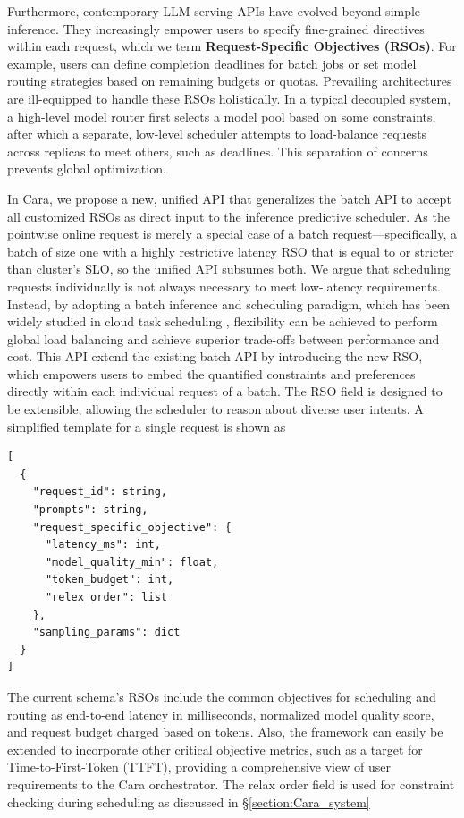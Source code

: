 \documentclass[letterpaper, anonymous, twocolumn, 10pt]{article}
\begin{document}
Furthermore, contemporary LLM serving APIs have evolved beyond simple inference. They increasingly empower users to specify fine-grained directives within each request, which we term \textbf{Request-Specific Objectives (RSOs)}. For example, users can define completion deadlines for batch jobs or set model routing strategies \cite{openaiIntroducingGPT5, microsoftModelRouter} based on remaining budgets or quotas. Prevailing architectures are ill-equipped to handle these RSOs holistically. In a typical decoupled system, a high-level model router first selects a model pool based on some constraints, after which a separate, low-level scheduler attempts to load-balance requests across replicas to meet others, such as deadlines. This separation of concerns prevents global optimization.

In Cara, we propose a new, unified API that generalizes the batch API to accept all customized RSOs as direct input to the inference predictive scheduler. As the pointwise online request is merely a special case of a batch request—specifically, a batch of size one with a highly restrictive latency RSO that is equal to or stricter than cluster's SLO, so the unified API subsumes both. We argue that scheduling requests individually is not always necessary to meet low-latency requirements. Instead, by adopting a batch inference and scheduling paradigm, which has been widely studied in cloud task scheduling \cite{eva-eurosys}, flexibility can be achieved to perform global load balancing and achieve superior trade-offs between performance and cost.  This API extend the existing batch API by introducing the new RSO, which empowers users to embed the quantified constraints and preferences directly within each individual request of a batch. The RSO field is designed to be extensible, allowing the scheduler to reason about diverse user intents. A simplified template for a single request is shown as
\begin{minipage}{\linewidth}
\begin{lstlisting}[style=jsonstyle, caption={Schema for Generate API request with RSOs.}, label={lst:api_schema}]
[
  {
    "request_id": string,
    "prompts": string,
    "request_specific_objective": {
      "latency_ms": int,
      "model_quality_min": float,
      "token_budget": int,
      "relex_order": list
    },
    "sampling_params": dict
  }
]
\end{lstlisting}
\end{minipage}
The current schema's RSOs include the common objectives for scheduling and routing as end-to-end latency in milliseconds, normalized model quality score, and request budget charged based on tokens. Also, the framework can easily be extended to incorporate other critical objective metrics, such as a target for Time-to-First-Token (TTFT), providing a comprehensive view of user requirements to the Cara orchestrator.  The relax order field is used for constraint checking during scheduling as discussed in \S \ref{section:Cara_system}
\end{document}
